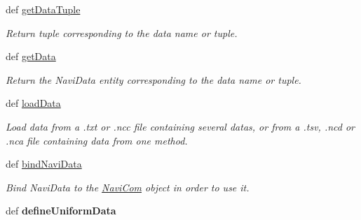 \begin{DoxyCompactItemize}
\item 
\hypertarget{classnavicom_1_1navicom_1_1NaviCom_ad8ac5b74afb4ceb6ed094604787d4d19}{
def \hyperlink{classnavicom_1_1navicom_1_1NaviCom_ad8ac5b74afb4ceb6ed094604787d4d19}{getDataTuple}}
\label{classnavicom_1_1navicom_1_1NaviCom_ad8ac5b74afb4ceb6ed094604787d4d19}

\begin{DoxyCompactList}\small\item\em Return tuple corresponding to the data name or tuple. \item\end{DoxyCompactList}\item 
\hypertarget{classnavicom_1_1navicom_1_1NaviCom_ad675e899836271ff4f2fd4bd17ea81d9}{
def \hyperlink{classnavicom_1_1navicom_1_1NaviCom_ad675e899836271ff4f2fd4bd17ea81d9}{getData}}
\label{classnavicom_1_1navicom_1_1NaviCom_ad675e899836271ff4f2fd4bd17ea81d9}

\begin{DoxyCompactList}\small\item\em Return the NaviData entity corresponding to the data name or tuple. \item\end{DoxyCompactList}\item 
def \hyperlink{classnavicom_1_1navicom_1_1NaviCom_a10e8b8a4c06b4ecf09366ca6b69efff6}{loadData}
\begin{DoxyCompactList}\small\item\em Load data from a .txt or .ncc file containing several datas, or from a .tsv, .ncd or .nca file containing data from one method. \item\end{DoxyCompactList}\item 
\hypertarget{classnavicom_1_1navicom_1_1NaviCom_ae310adb1d4e8932f0b72b6d8b6ca6301}{
def \hyperlink{classnavicom_1_1navicom_1_1NaviCom_ae310adb1d4e8932f0b72b6d8b6ca6301}{bindNaviData}}
\label{classnavicom_1_1navicom_1_1NaviCom_ae310adb1d4e8932f0b72b6d8b6ca6301}

\begin{DoxyCompactList}\small\item\em Bind NaviData to the \hyperlink{classnavicom_1_1navicom_1_1NaviCom}{NaviCom} object in order to use it. \item\end{DoxyCompactList}\item 
\hypertarget{classnavicom_1_1navicom_1_1NaviCom_a628c6252226b65dca80237d6783c08c6}{
def {\bfseries defineUniformData}}
\label{classnavicom_1_1navicom_1_1NaviCom_a628c6252226b65dca80237d6783c08c6}


\end{DoxyCompactItemize}
